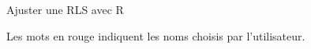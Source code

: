 \documentclass[letter, 11pt]{article}
\begin{document}
\vspace*{0.01 cm}
\begin{center}
{\Large Ajuster une RLS avec R}
\end{center}

Les mots en rouge indiquent les noms choisis par l'utilisateur.
\end{document}
